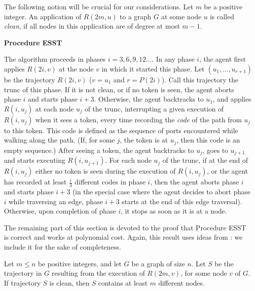 \documentclass [11pt] {article}
\begin{document}
{
The following notion will be crucial for our considerations. Let $m$ be a positive integer.  An application of $R(2m,u)$ to a graph $G$ at some node $u$ is called {\em clean}, if all nodes in this application are of degree at most $m-1$.}

\vspace*{0.2cm}
\noindent
{{\bf Procedure ESST}}

{The algorithm proceeds in {phases $i=3,6,9,12\dots$.} In any phase $i$, the agent first applies 
$R(2i,v)$
at the node $v$ in which it started this phase.
Let $(u_1,\dots , u_{r+1})$ be the trajectory $R(2i,v)$ ($v=u_1$ and $r=P(2i)$). Call this trajectory the trunc of this phase.
If it is not clean, or if no token is seen, the agent aborts phase $i$ and starts phase {$i+3$}. Otherwise, the agent backtracks to $u_1$, and applies 
$R(i,u_j)$
at each node $u_j$ of the trunc, interrupting a given execution of $R(i,u_j)$ when it sees a token, every time recording the {\em code} of the path from $u_j$ to this token. 
This code is defined as the sequence of ports
encountered while walking along the path.
(If, for some $j$, the token is at $u_j$, then this code is an empty sequence.) After seeing a token, the agent backtracks to $u_j$, goes
to $u_{j+1}$ and starts executing $R(i,u_{j+1})$. For each node $u_j$ of the trunc, if at the end of $R(i,u_j)$ either no token is seen during the execution of $R(i,u_j)$, or the agent has recorded at least {$\frac{i}{3}$} different codes in phase $i$, then
the agent aborts phase $i$ and starts phase {$i+3$} (in the special case where the agent decides to abort phase $i$ while traversing an edge, phase {$i+3$} starts at the end of this edge traversal). Otherwise, upon completion of phase $i$, it stops as soon as it is at a node.}

\vspace*{0.2cm}

{The remaining part of this section is devoted to the proof that Procedure ESST is correct and works at polynomial cost. Again, this result uses  ideas from \cite{DP}: we include it for the sake of completeness.}

\begin{lemma}\label{lemma}
{Let $m\leq n$ be positive integers, and let $G$ be a graph of size $n$. Let $S$ be the trajectory in $G$ resulting from the execution of $R(2m,v)$, for some node $v$ of $G$. If trajectory $S$ is clean, then $S$ contains at least $m$ different nodes.}
\end{lemma}
\end{document}
